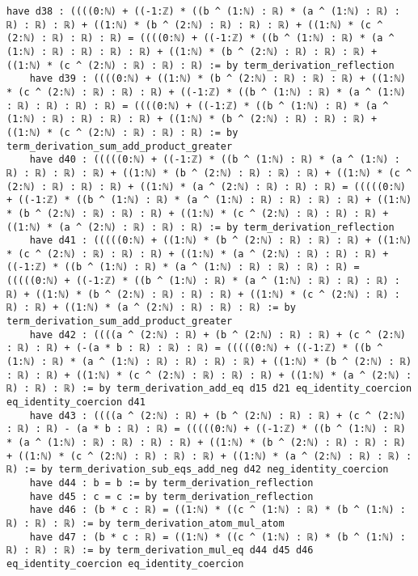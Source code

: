 \documentclass{article}
\begin{document}
\begin{tcolorbox}[colback=white!10, width=\linewidth]
\begin{lstlisting}[language=Lean4]
    have d38 : ((((0:ℕ) + ((-1:ℤ) * ((b ^ (1:ℕ) : ℝ) * (a ^ (1:ℕ) : ℝ) : ℝ) : ℝ) : ℝ) + ((1:ℕ) * (b ^ (2:ℕ) : ℝ) : ℝ) : ℝ) + ((1:ℕ) * (c ^ (2:ℕ) : ℝ) : ℝ) : ℝ) = ((((0:ℕ) + ((-1:ℤ) * ((b ^ (1:ℕ) : ℝ) * (a ^ (1:ℕ) : ℝ) : ℝ) : ℝ) : ℝ) + ((1:ℕ) * (b ^ (2:ℕ) : ℝ) : ℝ) : ℝ) + ((1:ℕ) * (c ^ (2:ℕ) : ℝ) : ℝ) : ℝ) := by term_derivation_reflection
    have d39 : ((((0:ℕ) + ((1:ℕ) * (b ^ (2:ℕ) : ℝ) : ℝ) : ℝ) + ((1:ℕ) * (c ^ (2:ℕ) : ℝ) : ℝ) : ℝ) + ((-1:ℤ) * ((b ^ (1:ℕ) : ℝ) * (a ^ (1:ℕ) : ℝ) : ℝ) : ℝ) : ℝ) = ((((0:ℕ) + ((-1:ℤ) * ((b ^ (1:ℕ) : ℝ) * (a ^ (1:ℕ) : ℝ) : ℝ) : ℝ) : ℝ) + ((1:ℕ) * (b ^ (2:ℕ) : ℝ) : ℝ) : ℝ) + ((1:ℕ) * (c ^ (2:ℕ) : ℝ) : ℝ) : ℝ) := by term_derivation_sum_add_product_greater
    have d40 : (((((0:ℕ) + ((-1:ℤ) * ((b ^ (1:ℕ) : ℝ) * (a ^ (1:ℕ) : ℝ) : ℝ) : ℝ) : ℝ) + ((1:ℕ) * (b ^ (2:ℕ) : ℝ) : ℝ) : ℝ) + ((1:ℕ) * (c ^ (2:ℕ) : ℝ) : ℝ) : ℝ) + ((1:ℕ) * (a ^ (2:ℕ) : ℝ) : ℝ) : ℝ) = (((((0:ℕ) + ((-1:ℤ) * ((b ^ (1:ℕ) : ℝ) * (a ^ (1:ℕ) : ℝ) : ℝ) : ℝ) : ℝ) + ((1:ℕ) * (b ^ (2:ℕ) : ℝ) : ℝ) : ℝ) + ((1:ℕ) * (c ^ (2:ℕ) : ℝ) : ℝ) : ℝ) + ((1:ℕ) * (a ^ (2:ℕ) : ℝ) : ℝ) : ℝ) := by term_derivation_reflection
    have d41 : (((((0:ℕ) + ((1:ℕ) * (b ^ (2:ℕ) : ℝ) : ℝ) : ℝ) + ((1:ℕ) * (c ^ (2:ℕ) : ℝ) : ℝ) : ℝ) + ((1:ℕ) * (a ^ (2:ℕ) : ℝ) : ℝ) : ℝ) + ((-1:ℤ) * ((b ^ (1:ℕ) : ℝ) * (a ^ (1:ℕ) : ℝ) : ℝ) : ℝ) : ℝ) = (((((0:ℕ) + ((-1:ℤ) * ((b ^ (1:ℕ) : ℝ) * (a ^ (1:ℕ) : ℝ) : ℝ) : ℝ) : ℝ) + ((1:ℕ) * (b ^ (2:ℕ) : ℝ) : ℝ) : ℝ) + ((1:ℕ) * (c ^ (2:ℕ) : ℝ) : ℝ) : ℝ) + ((1:ℕ) * (a ^ (2:ℕ) : ℝ) : ℝ) : ℝ) := by term_derivation_sum_add_product_greater
    have d42 : ((((a ^ (2:ℕ) : ℝ) + (b ^ (2:ℕ) : ℝ) : ℝ) + (c ^ (2:ℕ) : ℝ) : ℝ) + (-(a * b : ℝ) : ℝ) : ℝ) = (((((0:ℕ) + ((-1:ℤ) * ((b ^ (1:ℕ) : ℝ) * (a ^ (1:ℕ) : ℝ) : ℝ) : ℝ) : ℝ) + ((1:ℕ) * (b ^ (2:ℕ) : ℝ) : ℝ) : ℝ) + ((1:ℕ) * (c ^ (2:ℕ) : ℝ) : ℝ) : ℝ) + ((1:ℕ) * (a ^ (2:ℕ) : ℝ) : ℝ) : ℝ) := by term_derivation_add_eq d15 d21 eq_identity_coercion eq_identity_coercion d41
    have d43 : ((((a ^ (2:ℕ) : ℝ) + (b ^ (2:ℕ) : ℝ) : ℝ) + (c ^ (2:ℕ) : ℝ) : ℝ) - (a * b : ℝ) : ℝ) = (((((0:ℕ) + ((-1:ℤ) * ((b ^ (1:ℕ) : ℝ) * (a ^ (1:ℕ) : ℝ) : ℝ) : ℝ) : ℝ) + ((1:ℕ) * (b ^ (2:ℕ) : ℝ) : ℝ) : ℝ) + ((1:ℕ) * (c ^ (2:ℕ) : ℝ) : ℝ) : ℝ) + ((1:ℕ) * (a ^ (2:ℕ) : ℝ) : ℝ) : ℝ) := by term_derivation_sub_eqs_add_neg d42 neg_identity_coercion
    have d44 : b = b := by term_derivation_reflection
    have d45 : c = c := by term_derivation_reflection
    have d46 : (b * c : ℝ) = ((1:ℕ) * ((c ^ (1:ℕ) : ℝ) * (b ^ (1:ℕ) : ℝ) : ℝ) : ℝ) := by term_derivation_atom_mul_atom
    have d47 : (b * c : ℝ) = ((1:ℕ) * ((c ^ (1:ℕ) : ℝ) * (b ^ (1:ℕ) : ℝ) : ℝ) : ℝ) := by term_derivation_mul_eq d44 d45 d46 eq_identity_coercion eq_identity_coercion

\end{lstlisting}
\end{tcolorbox}
\end{document}
